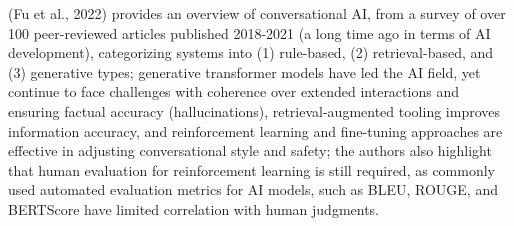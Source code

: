 \documentclass[
  letterpaper,
  DIV=11,
  numbers=noendperiod]{scrartcl}
\begin{document}
(Fu et al., 2022) provides an overview of conversational AI, from a
survey of over 100 peer-reviewed articles published 2018-2021 (a long
time ago in terms of AI development), categorizing systems into (1)
rule-based, (2) retrieval-based, and (3) generative types; generative
transformer models have led the AI field, yet continue to face
challenges with coherence over extended interactions and ensuring
factual accuracy (hallucinations), retrieval-augmented tooling improves
information accuracy, and reinforcement learning and fine-tuning
approaches are effective in adjusting conversational style and safety;
the authors also highlight that human evaluation for reinforcement
learning is still required, as commonly used automated evaluation
metrics for AI models, such as BLEU, ROUGE, and BERTScore have limited
correlation with human judgments.
\end{document}
